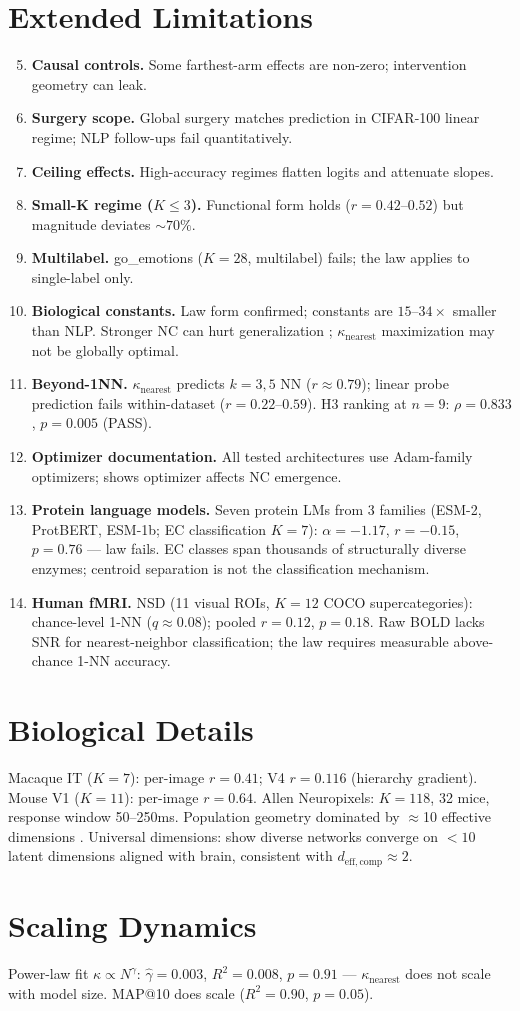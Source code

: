 \documentclass{article}
\begin{document}
\section{Extended Limitations}
\label{app:extended-limitations}
\begin{enumerate}[nosep]
\setcounter{enumi}{4}
\item \textbf{Causal controls.} Some farthest-arm effects are non-zero; intervention geometry can leak.
\item \textbf{Surgery scope.} Global surgery matches prediction in CIFAR-100 linear regime; NLP follow-ups fail quantitatively.
\item \textbf{Ceiling effects.} High-accuracy regimes flatten logits and attenuate slopes.
\item \textbf{Small-K regime ($K\leq3$).} Functional form holds ($r=0.42$--$0.52$) but magnitude deviates $\sim70\%$.
\item \textbf{Multilabel.} go\_emotions ($K=28$, multilabel) fails; the law applies to single-label only.
\item \textbf{Biological constants.} Law form confirmed; constants are $15$--$34\times$ smaller than NLP. Stronger NC can hurt generalization \citep{harun2025}; $\kappa_\mathrm{nearest}$ maximization may not be globally optimal.
\item \textbf{Beyond-1NN.} $\kappa_\mathrm{nearest}$ predicts $k=3,5$ NN ($r\approx0.79$); linear probe prediction fails within-dataset ($r=0.22$--$0.59$). H3 ranking at $n=9$: $\rho=0.833$, $p=0.005$ (PASS).
\item \textbf{Optimizer documentation.} All tested architectures use Adam-family optimizers; \citet{zhao2026optimizer} shows optimizer affects NC emergence.
\item \textbf{Protein language models.} Seven protein LMs from 3 families (ESM-2, ProtBERT, ESM-1b; EC classification $K=7$): $\alpha=-1.17$, $r=-0.15$, $p=0.76$ --- law fails. EC classes span thousands of structurally diverse enzymes; centroid separation is not the classification mechanism.
\item \textbf{Human fMRI.} NSD (11 visual ROIs, $K=12$ COCO supercategories): chance-level 1-NN ($q\approx0.08$); pooled $r=0.12$, $p=0.18$. Raw BOLD lacks SNR for nearest-neighbor classification; the law requires measurable above-chance 1-NN accuracy.
\end{enumerate}

\section{Biological Details}
\label{app:biological}
Macaque IT \citep{cadieu2014deep} ($K=7$): per-image $r=0.41$; V4 $r=0.116$ (hierarchy gradient).
Mouse V1 \citep{stringer2018spontaneous} ($K=11$): per-image $r=0.64$.
Allen Neuropixels: $K=118$, 32 mice, response window 50--250ms. Population geometry dominated by $\approx$10 effective dimensions \citep{pospisil2025}.
Universal dimensions: \citet{chen2025universal} show diverse networks converge on $<10$ latent dimensions aligned with brain, consistent with $d_\mathrm{eff,comp}\approx2$.

\section{Scaling Dynamics}
\label{app:scaling}
Power-law fit $\kappa\propto N^\gamma$: $\hat\gamma=0.003$, $R^2=0.008$, $p=0.91$ --- $\kappa_\mathrm{nearest}$ does not scale with model size. MAP@10 does scale ($R^2=0.90$, $p=0.05$).
\end{document}
